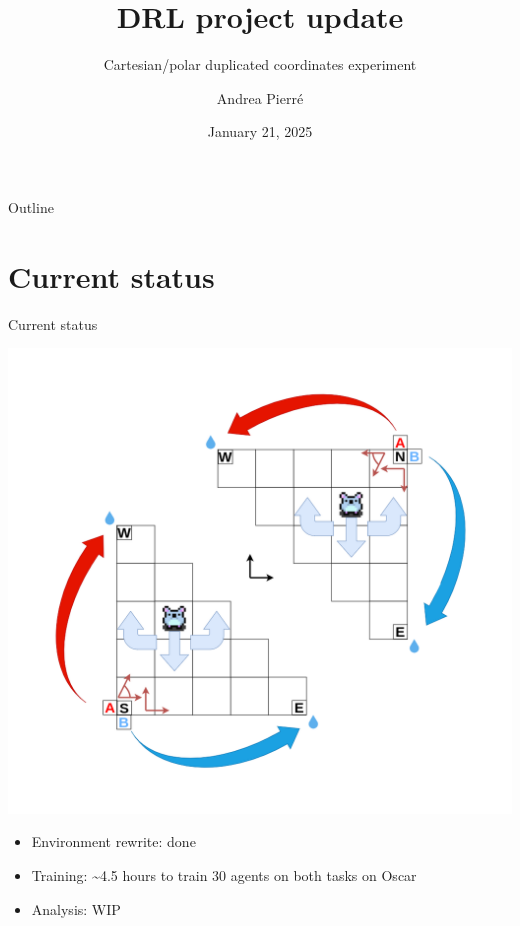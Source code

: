 \documentclass[bigger]{beamer}
\author{Andrea Pierré}
\date{January 21, 2025}
\title{DRL project update}
\subtitle{Cartesian/polar duplicated coordinates experiment}
\begin{document}
\maketitle
\begin{frame}[plain]{Outline}
\tableofcontents
\end{frame}

\section{Current status}
\label{sec:orgc6a9830}
\begin{frame}[label={sec:org9693705}]{Current status}
\begin{center}
\includegraphics[height=0.6\textheight]{img/RL_env-cartesian-polar.drawio.png}
\end{center}
\begin{itemize}
\item Environment rewrite: done
\item Training: \textasciitilde{}4.5 hours to train 30 agents on both tasks on Oscar
\item Analysis: WIP
\end{itemize}
\end{frame}
\end{document}
